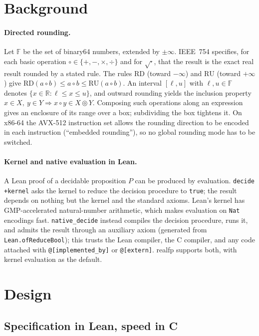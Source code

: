 \documentclass[11pt]{article}
\theoremstyle{definition}
\theoremstyle{remark}
\newcommand{\R}{\mathbb{R}}
\newcommand{\F}{\mathbb{F}}
\newcommand{\RD}{\mathrm{RD}}
\newcommand{\RU}{\mathrm{RU}}
\newcommand{\lean}[1]{\texttt{#1}}
\newcommand{\realfp}{\textsf{realfp}}
\begin{document}
\section{Background}

\paragraph{Directed rounding.}
Let $\F$ be the set of binary64 numbers, extended by $\pm\infty$. IEEE~754
\cite{ieee754} specifies, for each basic operation $\circ\in\{+,-,\times,\div\}$
and for $\sqrt{\cdot}$, that the result is the exact real result rounded by a
stated rule. The rules $\RD$ (toward $-\infty$) and $\RU$ (toward
$+\infty$) give $\RD(a\circ b)\le a\circ b\le\RU(a\circ b)$. An interval
$[\ell,u]$ with $\ell,u\in\F$ denotes $\{x\in\R:\ell\le x\le u\}$, and
outward rounding yields the inclusion property $x\in X,\ y\in Y\Rightarrow
x\circ y\in X\circledcirc Y$. Composing such operations along an expression
gives an enclosure of its range over a box; subdividing the box tightens it.
On x86-64 the AVX-512 instruction set allows the rounding direction to be
encoded in each instruction (``embedded rounding''), so no global rounding
mode has to be switched.

\paragraph{Kernel and native evaluation in Lean.}
A Lean proof of a decidable proposition $P$ can be produced by evaluation.
\lean{decide +kernel} asks the kernel to reduce the decision procedure to
\lean{true}; the result depends on nothing but the kernel and the standard
axioms. Lean's kernel has GMP-accelerated natural-number arithmetic, which
makes evaluation on \lean{Nat} encodings fast. \lean{native\_decide} instead
compiles the decision procedure, runs it, and admits the result through an
auxiliary axiom (generated from \lean{Lean.ofReduceBool}); this trusts the
Lean compiler, the C compiler, and any code attached with
\lean{@[implemented\_by]} or \lean{@[extern]}. \realfp{} supports both,
with kernel evaluation as the default.

\section{Design}\label{sec:design}

\subsection{Specification in Lean, speed in C}
\end{document}

